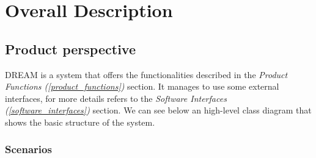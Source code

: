 \documentclass[table, 12pt]{article}
\begin{document}
\section{Overall Description}
\subsection{Product perspective}
DREAM is a system that offers the functionalities described in the \textit{Product Functions (\ref{product_functions})} section.
It manages to use some external interfaces, for more details refers to the \textit{Software Interfaces (\ref{software_interfaces})} section.
We can see below an high-level class diagram that shows the basic structure of the system.
\subsubsection{Scenarios}
\end{document}
